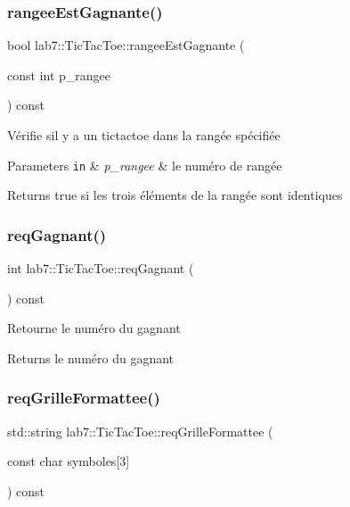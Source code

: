 \subsubsection{\texorpdfstring{rangee\+Est\+Gagnante()}{rangeeEstGagnante()}}
{\footnotesize\ttfamily bool lab7\+::\+Tic\+Tac\+Toe\+::rangee\+Est\+Gagnante (\begin{DoxyParamCaption}\item[{const int}]{p\+\_\+rangee }\end{DoxyParamCaption}) const}

Vérifie s\textquotesingle{}il y a un tictactoe dans la rangée spécifiée 
\begin{DoxyParams}[1]{Parameters}
\mbox{\tt in}  & {\em p\+\_\+rangee} & le numéro de rangée \\
\hline
\end{DoxyParams}
\begin{DoxyReturn}{Returns}
true si les trois éléments de la rangée sont identiques 
\end{DoxyReturn}
\mbox{\label{classlab7_1_1TicTacToe_a6b79c847e3f8088602e869fd88cf4479}} 
\subsubsection{\texorpdfstring{req\+Gagnant()}{reqGagnant()}}
{\footnotesize\ttfamily int lab7\+::\+Tic\+Tac\+Toe\+::req\+Gagnant (\begin{DoxyParamCaption}{ }\end{DoxyParamCaption}) const}

Retourne le numéro du gagnant \begin{DoxyReturn}{Returns}
le numéro du gagnant 
\end{DoxyReturn}
\mbox{\label{classlab7_1_1TicTacToe_ad014f5c637baa564c99d4ddb0e744f8e}} 
\subsubsection{\texorpdfstring{req\+Grille\+Formattee()}{reqGrilleFormattee()}}
{\footnotesize\ttfamily std\+::string lab7\+::\+Tic\+Tac\+Toe\+::req\+Grille\+Formattee (\begin{DoxyParamCaption}\item[{const char}]{symboles\mbox{[}3\mbox{]} }\end{DoxyParamCaption}) const}

